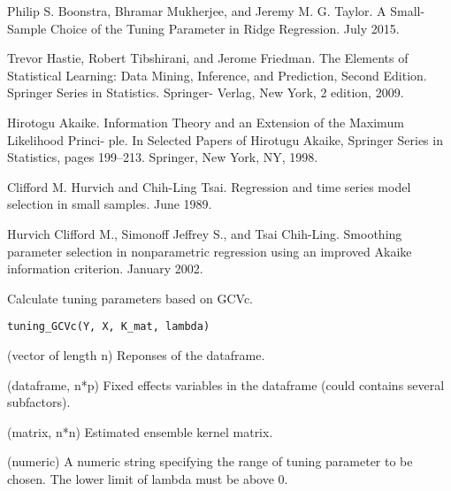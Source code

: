 \documentclass[a4paper]{book}
\begin{document}
\begin{References}\relax
Philip S. Boonstra, Bhramar Mukherjee, and Jeremy M. G. Taylor.
A Small-Sample Choice of the Tuning Parameter in Ridge Regression. July
2015.

Trevor Hastie, Robert Tibshirani, and Jerome Friedman. The Elements of
Statistical Learning: Data Mining, Inference, and Prediction, Second
Edition. Springer Series in Statistics. Springer- Verlag, New York, 2
edition, 2009.

Hirotogu Akaike. Information Theory and an Extension of the Maximum
Likelihood Princi- ple. In Selected Papers of Hirotugu Akaike, Springer
Series in Statistics, pages 199–213. Springer, New York, NY, 1998.

Clifford M. Hurvich and Chih-Ling Tsai. Regression and time series model
selection in small samples. June 1989.

Hurvich Clifford M., Simonoff Jeffrey S., and Tsai Chih-Ling. Smoothing
parameter selection in nonparametric regression using an improved Akaike
information criterion. January 2002.
\end{References}
%
\begin{Description}\relax
Calculate tuning parameters based on GCVc.
\end{Description}
%
\begin{Usage}
\begin{verbatim}
tuning_GCVc(Y, X, K_mat, lambda)
\end{verbatim}
\end{Usage}
%
\begin{Arguments}
\begin{ldescription}
\item[\code{Y}] (vector of length n) Reponses of the dataframe.

\item[\code{X}] (dataframe, n*p) Fixed effects variables in the dataframe (could
contains several subfactors).

\item[\code{K\_mat}] (matrix, n*n) Estimated ensemble kernel matrix.

\item[\code{lambda}] (numeric) A numeric string specifying the range of tuning parameter 
to be chosen. The lower limit of lambda must be above 0.
\end{ldescription}
\end{Arguments}
%
\begin{Details}\relax
{}

\end{Details}
\end{document}
